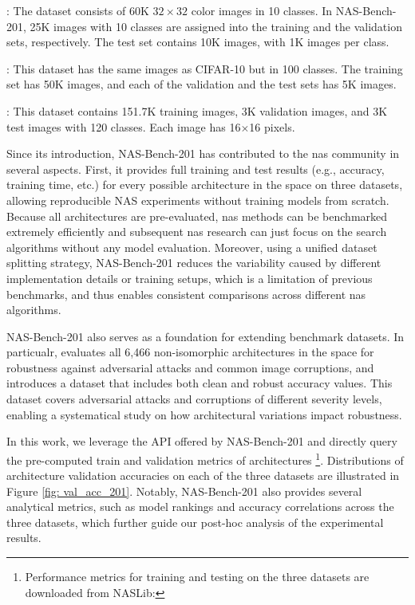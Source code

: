 \documentclass[a4paper,oneside,bibliography=totoc]{scrbook}
\begin{document}
\begin{description}[leftmargin=0cm, listparindent=\parindent]
 	\item[CIFAR10]:	The dataset consists of 60K $32\times32$ color images in 10 classes. In NAS-Bench-201, 25K images with 10 classes are assigned into the training and the validation sets, respectively. The test set contains 10K images, with 1K images per class.
 	\item[CIFAR100]: This dataset has the same images as CIFAR-10 but in 100 classes. The training set has 50K images, and each of the validation and the test sets has 5K images.
 	\item[ImageNet16-120]: This dataset contains 151.7K training images, 3K validation images, and 3K test images with 120 classes. Each image has 16$\times$16 pixels.
\end{description} 


Since its introduction, NAS-Bench-201 has contributed to the \gls{nas} community in several aspects. First, it provides full training and test results (e.g., accuracy, training time, etc.) for every possible architecture in the space on three datasets, allowing reproducible NAS experiments without training models from scratch. Because all architectures are pre-evaluated, \gls{nas} methods can be benchmarked extremely efficiently and subsequent \gls{nas} research can just focus on the search algorithms without any model evaluation. Moreover, using a unified dataset splitting strategy, NAS-Bench-201 reduces the variability caused by different implementation details or training setups, which is a limitation of previous benchmarks, and thus enables consistent comparisons across different \gls{nas} algorithms. 

\vspace{0.2em}	
NAS-Bench-201 also serves as a foundation for extending benchmark datasets. In particualr, \cite{jung2023neural} evaluates all 6,466 non-isomorphic architectures in the space for robustness against adversarial attacks and common image corruptions, and introduces a dataset that includes both clean and robust accuracy values. This dataset covers adversarial attacks and corruptions of different severity levels, enabling a systematical study on how architectural variations impact robustness.

\vspace{0.2em}
In this work, we leverage the API offered by NAS-Bench-201 and directly query the pre-computed train and validation metrics of architectures \footnote{Performance metrics for training and testing on the three datasets are downloaded from NASLib: }. Distributions of architecture validation accuracies on each of the three datasets are illustrated in Figure \ref{fig: val_acc_201}. Notably, NAS-Bench-201 also provides several analytical metrics, such as model rankings and accuracy correlations across the three datasets, which further guide our post-hoc analysis of the experimental results.
\end{document}
